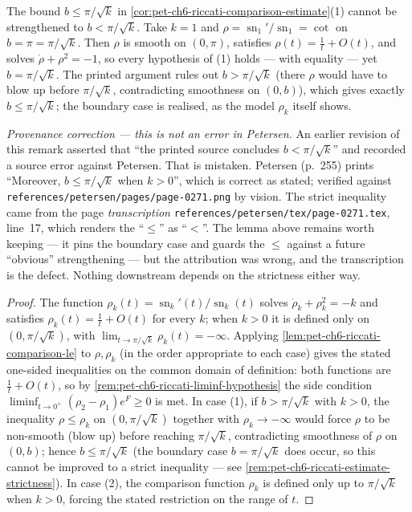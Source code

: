 \begin{remark}
  \label{rem:pet-ch6-riccati-estimate-strictness}
  \leanok
  The bound $b\le\pi/\sqrt k$ in \cref{cor:pet-ch6-riccati-comparison-estimate}(1)
  cannot be strengthened to $b<\pi/\sqrt k$. Take $k=1$ and
  $\rho=\operatorname{sn}_1'/\operatorname{sn}_1=\cot$ on $b=\pi=\pi/\sqrt k$. Then $\rho$ is
  smooth on $(0,\pi)$, satisfies $\rho(t)=\tfrac1t+O(t)$, and solves
  $\dot\rho+\rho^2=-1$, so every hypothesis of (1) holds — with equality — yet
  $b=\pi/\sqrt k$. The printed argument rules out $b>\pi/\sqrt k$ (there $\rho$
  would have to blow up before $\pi/\sqrt k$, contradicting smoothness on
  $(0,b)$), which gives exactly $b\le\pi/\sqrt k$; the boundary case is realised,
  as the model $\rho_k$ itself shows.

  \emph{Provenance correction — this is not an error in Petersen.} An earlier
  revision of this remark asserted that ``the printed source concludes
  $b<\pi/\sqrt k$'' and recorded a source error against Petersen. That is
  mistaken. Petersen (p.~255) prints ``Moreover, $b\le\pi/\sqrt k$ when $k>0$'',
  which is correct as stated; verified against
  \texttt{references/petersen/pages/page-0271.png} by vision. The strict
  inequality came from the page \emph{transcription}
  \texttt{references/petersen/tex/page-0271.tex}, line~17, which renders the
  ``$\le$'' as ``$<$''. The lemma above remains worth keeping — it pins the
  boundary case and guards the $\le$ against a future ``obvious''
  strengthening — but the attribution was wrong, and the transcription is the
  defect. Nothing downstream depends on the strictness either way.
\end{remark}
\begin{proof}
  The function $\rho_k(t)=\operatorname{sn}_k'(t)/\operatorname{sn}_k(t)$ solves $\dot\rho_k+\rho_k^2=-k$
  and satisfies $\rho_k(t)=\tfrac1t+O(t)$ for every $k$; when $k>0$ it is
  defined only on $(0,\pi/\sqrt k)$, with
  $\lim_{t\to\pi/\sqrt k}\rho_k(t)=-\infty$. Applying
  \cref{lem:pet-ch6-riccati-comparison-le} to $\rho,\rho_k$ (in the
  order appropriate to each case) gives the stated one-sided inequalities on the
  common domain of definition: both functions are $\tfrac1t+O(t)$, so by
  \cref{rem:pet-ch6-riccati-liminf-hypothesis} the side condition
  $\liminf_{t\to0^+}(\rho_2-\rho_1)e^{F}\ge0$ is met. In case
  (1), if $b>\pi/\sqrt k$ with $k>0$, the inequality $\rho\le\rho_k$ on
  $(0,\pi/\sqrt k)$ together with $\rho_k\to-\infty$ would force $\rho$ to be
  non-smooth (blow up) before reaching $\pi/\sqrt k$, contradicting
  smoothness of $\rho$ on $(0,b)$; hence $b\le\pi/\sqrt k$ (the boundary case
  $b=\pi/\sqrt k$ does occur, so this cannot be improved to a strict inequality —
  see \cref{rem:pet-ch6-riccati-estimate-strictness}). In case (2), the
  comparison function $\rho_k$ is defined only up to $\pi/\sqrt k$ when
  $k>0$, forcing the stated restriction on the range of $t$.
\end{proof}

